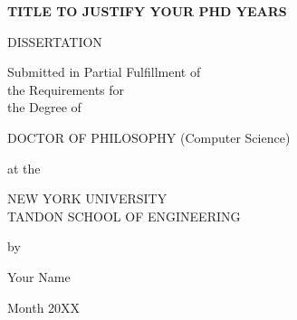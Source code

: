\documentclass[12pt,draft,letterpaper]{report}
\newcommand{\thesistitle}{TITLE TO JUSTIFY YOUR PHD YEARS}
\newcommand{\thesisauthor}{Your Name}
\newcommand{\graddate}{Month 20XX} %
\begin{document}
%
\setcounter{page}{1}
\thispagestyle{empty}
%
\begin{center}
{\bfseries 
  {\large\thesistitle}
  \vspace{.25in}
  
  DISSERTATION\\
  \vspace{.25in}
  
  \begin{doublespace}
  Submitted in Partial Fulfillment of\\
  the Requirements for\\
  the Degree of\\
  \end{doublespace}
  \vspace{.25in}
  
  DOCTOR OF PHILOSOPHY (Computer Science)\\
  \vspace{.25in}
  
  at the \\
  \vspace{.1in}
  
  {\large
  NEW YORK UNIVERSITY\\
  \vspace{-0.05in}
  TANDON SCHOOL OF ENGINEERING\\
  }
  \vspace{.2in}
  
  by
  \vspace{.3in}

  \thesisauthor
  \vspace{.3in}

  \graddate
}

\end{center}

\vspace{0.2in}

\noindent
{}
\vspace{0.1in}

\noindent
\makebox[\textwidth]{\hfill\makebox[2.5in]{\hrulefill}}\\
\vspace{0.05in}

\noindent
\makebox[\textwidth]{\hfill\makebox[2.5in]{\hrulefill}}\\
\end{document}
